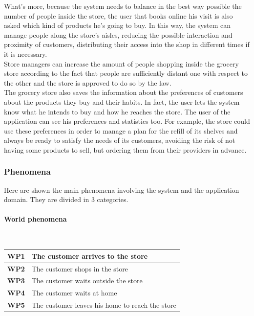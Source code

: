 \documentclass[]{article}
\begin{document}
What’s more, because the system needs to balance in the best way possible the number of people inside the store, the user that books online his visit is also asked which kind of products he’s going to buy. In this way, the system can manage people along the store’s aisles, reducing the possible interaction and proximity of customers, distributing their access into the shop in different times if it is necessary. \\Store managers can increase the amount of people shopping inside the grocery store according to the fact that people are sufficiently distant one with respect to the other and the store is approved to do so by the law.\\
The grocery store also saves the information about the preferences of customers about the products they buy and their habits. In fact, the user lets the system know what he intends to buy and how he reaches the store. The user of the application can see his preferences and statistics too. For example, the store could use these preferences in order to manage a plan for the refill of its shelves and always be ready to satisfy the needs of its customers, avoiding the risk of not having some products to sell, but ordering them from their providers in advance.\\

			
	
		
	
		\subsubsection{Phenomena}
		Here are shown the main phenomena involving the system and the application domain. They are divided in 3 categories.

		
		\paragraph{World phenomena}
		\textbf{}\\\newline
			\begin{tabular}{|c|l|}
				\hline
				\rowcolor[HTML]{DCDCDC} 
				\textbf{WP1} & 
				\begin{minipage}[t]{13cm}
				The customer arrives to the store 
				\end{minipage} 
				\\ \hline
				\textbf{WP2} & The customer shops in the store \\ \hline
				\rowcolor[HTML]{DCDCDC} 
				\textbf{WP3} & The customer waits outside the store \\ \hline
				\textbf{WP4} & The customer waits at home \\ \hline
				\rowcolor[HTML]{DCDCDC} 
				\textbf{WP5} & The customer leaves his home to reach the store \\ \hline
				
			\end{tabular}
\end{document}
